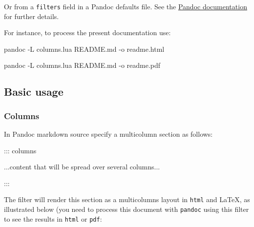 \documentclass[
]{article}
\newenvironment{Shaded}{}{}
\newcommand{\AttributeTok}[1]{\textcolor[rgb]{0.49,0.56,0.16}{#1}}
\newcommand{\ExtensionTok}[1]{#1}
\newcommand{\NormalTok}[1]{#1}
\begin{document}
Or from a \texttt{filters} field in a Pandoc defaults file. See the
\href{https://pandoc.org/MANUAL.html}{Pandoc documentation} for further
details.

For instance, to process the present documentation use:

\begin{Shaded}
\begin{Highlighting}[]
\ExtensionTok{pandoc} \AttributeTok{{-}L}\NormalTok{ columns.lua README.md }\AttributeTok{{-}o}\NormalTok{ readme.html}

\ExtensionTok{pandoc} \AttributeTok{{-}L}\NormalTok{ columns.lua README.md }\AttributeTok{{-}o}\NormalTok{ readme.pdf}
\end{Highlighting}
\end{Shaded}

\hypertarget{basic-usage}{%
\subsection{Basic usage}\label{basic-usage}}

\hypertarget{columns-1}{%
\subsubsection{Columns}\label{columns-1}}

In Pandoc markdown source specify a multicolumn section as follows:

\begin{Shaded}
\begin{Highlighting}[]
\NormalTok{::: columns}

\NormalTok{...content that will be spread over several columns...}

\NormalTok{:::}
\end{Highlighting}
\end{Shaded}

The filter will render this section as a multicolumns layout in
\texttt{html} and LaTeX, as illustrated below (you need to process this
document with \texttt{pandoc} using this filter to see the results in
\texttt{html} or \texttt{pdf}:
\end{document}
